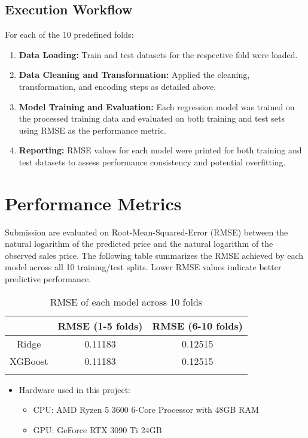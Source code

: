 \documentclass[11pt,a4paper]{article}
\begin{document}
\subsection{Execution Workflow}
For each of the 10 predefined folds:
\begin{enumerate}
  \item \textbf{Data Loading:} Train and test datasets for the respective fold were loaded.
  \item \textbf{Data Cleaning and Transformation:} Applied the cleaning, transformation, and encoding steps as detailed above.
  \item \textbf{Model Training and Evaluation:} Each regression model was trained on the processed training data and evaluated on both training and test sets using RMSE as the performance metric.
  \item \textbf{Reporting:} RMSE values for each model were printed for both training and test datasets to assess performance consistency and potential overfitting.
\end{enumerate}

\section{Performance Metrics}
Submission are evaluated on Root-Mean-Squared-Error (RMSE) between the natural
logarithm of the predicted price and the natural logarithm of the observed
sales price. The following table summarizes the RMSE achieved by each model
across all 10 training/test splits. Lower RMSE values indicate better
predictive performance.

\begin{table}[h]
  \centering
  \begin{tabular}{c c c}
    \Xhline{2\arrayrulewidth}
            & RMSE (1-5 folds) & RMSE (6-10 folds) \\
    \hline
    Ridge   & 0.11183          & 0.12515           \\
    XGBoost & 0.11183          & 0.12515           \\
    \Xhline{2\arrayrulewidth}
  \end{tabular}
  \caption{RMSE of each model across 10 folds}
\end{table}

\begin{itemize}
  \item Hardware used in this project:
        \begin{itemize}
          \item CPU: AMD Ryzen 5 3600 6-Core Processor with 48GB RAM
          \item GPU: GeForce RTX 3090 Ti 24GB
        \end{itemize}
\end{itemize}
\end{document}
